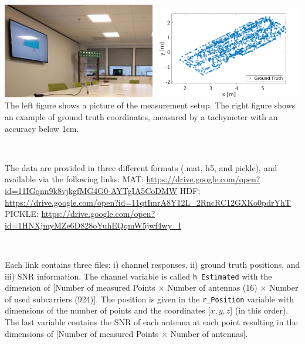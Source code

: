 \documentclass[letter]{moderncv} %
\begin{document}
~


\includegraphics[width=0.5\textwidth]{ParisEnvironment}\includegraphics[width=0.5\textwidth]{IndoorDataset}
The left figure shows a picture of the measurement setup. The
right figure shows  an example of  ground truth coordinates, measured by a tachymeter with an accuracy below 1cm.
\vspace{4ex}

 
~

The data are provided in three different formats (.mat, h5, and pickle), and    available via the following links: \newline
  MAT:    \url{https://drive.google.com/open?id=11IGqnn9k8vjkgfMG4G0-AYTgIA5CoDMW} \newline
  HDF;    \url{https://drive.google.com/open?id=11qtImrA8Y12L_2RncRC12GXKo0pdrYhT} \newline
  PICKLE: \url{https://drive.google.com/open?id=1HNXjmyMZe6D828oYuhEQqmW5jwf4wy_I} \newline

~

Each link contains three files:    i) channel responses, ii) ground truth positions, and iii) SNR information.   
The channel variable is called \texttt{h\_Estimated} with the dimension of [Number of measured Points $\times$ Number of antennas (16) $\times$ Number of used subcarriers (924)]. The position is given in the \texttt{r\_Position} variable with dimensions of the number of points  and the coordinates [$x,y,z$] (in this order). The last variable contains the SNR of each antenna at each point resulting in the dimensions 
of [Number of measured Points $\times$ Number of antennas].
\end{document}
